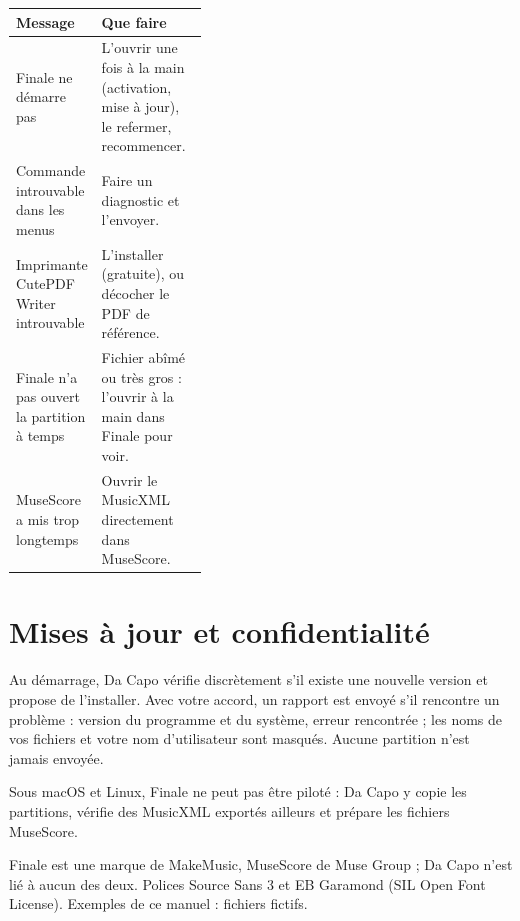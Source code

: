 \begin{center}
\renewcommand{\arraystretch}{1.35}
\begin{tabularx}{\linewidth}{>{\raggedright\arraybackslash}p{0.38\linewidth} X}
\toprule
\textbf{Message} & \textbf{Que faire} \\
\midrule
Finale ne démarre pas & L'ouvrir une fois à la main (activation, mise à jour), le refermer, recommencer. \\
Commande introuvable dans les menus & Faire un diagnostic et l'envoyer. \\
Imprimante CutePDF Writer introuvable & L'installer (gratuite), ou décocher le PDF de référence. \\
Finale n'a pas ouvert la partition à temps & Fichier abîmé ou très gros : l'ouvrir à la main dans Finale pour voir. \\
MuseScore a mis trop longtemps & Ouvrir le MusicXML directement dans MuseScore. \\
\bottomrule
\end{tabularx}
\end{center}

\section{Mises à jour et confidentialité}

Au démarrage, Da Capo vérifie discrètement s'il existe une nouvelle version et propose de
l'installer. Avec votre accord, un rapport est envoyé s'il rencontre un problème : version du
programme et du système, erreur rencontrée ; les noms de vos fichiers et votre nom d'utilisateur
sont masqués. Aucune partition n'est jamais envoyée.

Sous macOS et Linux, Finale ne peut pas être piloté : Da Capo y copie les partitions, vérifie des
MusicXML exportés ailleurs et prépare les fichiers MuseScore.

\vfill
{\footnotesize\color{summit}\sffamily
Finale est une marque de MakeMusic, MuseScore de Muse Group ; Da Capo n'est lié à aucun des deux.
Polices Source Sans 3 et EB Garamond (SIL Open Font License). Exemples de ce manuel : fichiers fictifs.\par}


